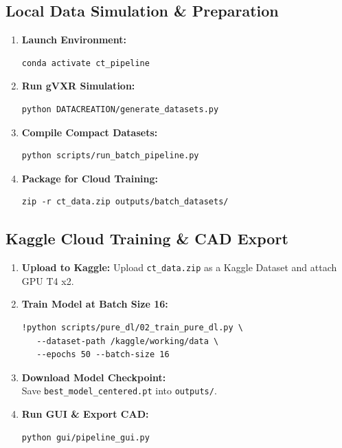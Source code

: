 \documentclass[10pt,a4paper]{article}
\begin{document}
\begin{minipage}[t]{0.48\textwidth}
\subsection{Local Data Simulation \& Preparation}
\begin{enumerate}[leftmargin=*,noitemsep]
    \item \textbf{Launch Environment:}
    \begin{verbatim}
conda activate ct_pipeline
    \end{verbatim}
    \item \textbf{Run gVXR Simulation:}
    \begin{verbatim}
python DATACREATION/generate_datasets.py
    \end{verbatim}
    \item \textbf{Compile Compact Datasets:}
    \begin{verbatim}
python scripts/run_batch_pipeline.py
    \end{verbatim}
    \item \textbf{Package for Cloud Training:}
    \begin{verbatim}
zip -r ct_data.zip outputs/batch_datasets/
    \end{verbatim}
\end{enumerate}
\end{minipage}
\hfill
\begin{minipage}[t]{0.48\textwidth}
\subsection{Kaggle Cloud Training \& CAD Export}
\begin{enumerate}[leftmargin=*,noitemsep]
    \item \textbf{Upload to Kaggle:} Upload \texttt{ct\_data.zip} as a Kaggle Dataset and attach GPU T4 x2.
    \item \textbf{Train Model at Batch Size 16:}
    \begin{verbatim}
!python scripts/pure_dl/02_train_pure_dl.py \
   --dataset-path /kaggle/working/data \
   --epochs 50 --batch-size 16
    \end{verbatim}
    \item \textbf{Download Model Checkpoint:}\\
    Save \texttt{best\_model\_centered.pt} into \texttt{outputs/}.
    \item \textbf{Run GUI \& Export CAD:}
    \begin{verbatim}
python gui/pipeline_gui.py
    \end{verbatim}
\end{enumerate}
\end{minipage}
\end{document}
